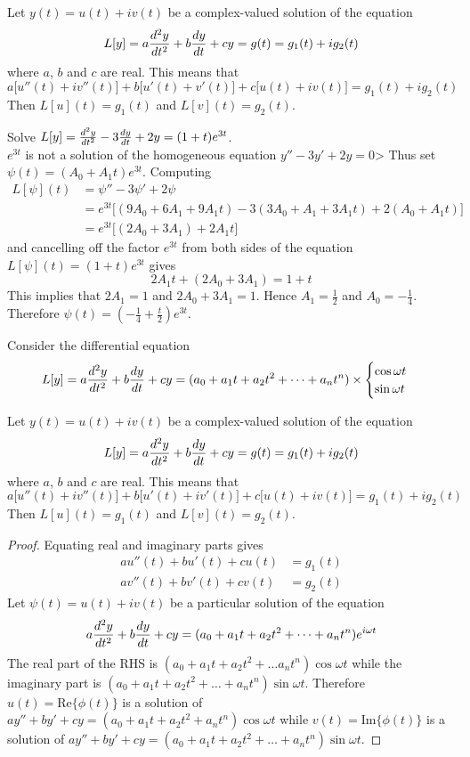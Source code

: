 \documentclass[12pt]{article}
\begin{document}
\begin{theorem} Let $y(t) = u(t) + iv(t)$ be a complex-valued solution of the equation $$L[y] = a\frac{d^2y}{dt^2} + b\frac{dy}{dt} + cy = g(t) = g_1(t) + ig_2(t)$$ where $a$, $b$ and $c$ are real. This means that $$a\Big[u''(t) + iv''(t)\Big] + b\Big[u'(t) + v'(t)\Big] + c\Big[u(t) + iv(t)\Big] = g_1(t) + ig_2(t)$$ Then $L[u](t) = g_1(t)$ and $L[v](t) = g_2(t)$. \end{theorem}

\begin{example} Solve $L[y] = \frac{d^2y}{dt^2} - 3\frac{dy}{dt} + 2y = (1 + t)e^{3t}$. \\ 
$e^{3t}$ is not a solution of the homogeneous equation $y'' - 3y' + 2y = 0$> Thus set $\psi(t) = (A_0 + A_1t)e^{3t}$. Computing $$\begin{aligned} L[\psi](t) &= \psi'' - 3\psi' + 2\psi \\ &= e^{3t}\Big[(9A_0 + 6A_1 + 9A_1t) - 3(3A_0 + A_1 + 3A_1t) + 2(A_0 + A_1t)\Big] \\ &= e^{3t}\Big[(2A_0 + 3A_1) + 2A_1t\Big] \end{aligned} $$ and cancelling off the factor $e^{3t}$ from both sides of the equation $L[\psi](t) = (1 + t)e^{3t}$ gives $$2A_1t + (2A_0 + 3A_1) = 1 + t $$ This implies that $2A_1 = 1$ and $2A_0 + 3A_1 = 1$. Hence $A_1 = \frac{1}{2}$ and $A_0 = -\frac{1}{4}$. Therefore $\psi(t) = (-\frac{1}{4} + \frac{t}{2})e^{3t}$. \end{example}

Consider the differential equation $$L[y] = a\frac{d^2y}{dt^2} + b\frac{dy}{dt} + cy = (a_0 + a_1t + a_2t^2 + \dots + a_nt^n) \times \begin{cases} \cos \omega t \\ \sin \omega t \end{cases} $$ 

\begin{theorem} Let $y(t) = u(t) + iv(t)$ be a complex-valued solution of the equation $$L[y] = a\frac{d^2y}{dt^2} + b\frac{dy}{dt} + cy = g(t) = g_1(t) + ig_2(t) $$ where $a$, $b$ and $c$ are real. This means that $$a\Big[ u''(t) + iv''(t)\Big] + b\Big[u'(t) + iv'(t)\Big] + c\Big[u(t) + iv(t)] = g_1(t) + ig_2(t)$$ Then $L[u](t) = g_1(t)$ and $L[v](t) = g_2(t)$. \end{theorem} 

\begin{proof} Equating real and imaginary parts gives $$\begin{aligned} au''(t) + bu'(t) + cu(t) &= g_1(t) \\ av''(t) + bv'(t) + cv(t) &= g_2(t) \end{aligned} $$ Let $\psi(t) = u(t) + iv(t)$ be a particular solution of the equation $$a\frac{d^2y}{dt^2} + b\frac{dy}{dt} + cy = (a_0 + a_1t + a_2t^2 + \dots + a_nt^n)e^{i\omega t} $$ The real part of the RHS is $(a_0 + a_1t + a_2t^2 + \dots a_nt^n)\cos \omega t$ while the imaginary part is $(a_0 + a_1t + a_2t^2 + \dots + a_nt^n)\sin \omega t$. Therefore $u(t) = \text{Re}\{\phi(t)\}$ is a solution of $ay'' + by' + cy = (a_0 + a_1t + a_2t^2 + a_nt^n)\cos \omega t$ while $v(t) = \text{Im}\{\phi(t)\}$ is a solution of $ay'' + by' + cy = (a_0 + a_1t + a_2t^2 + \dots + a_nt^n) \sin \omega t$. \end{proof} 
\end{document}
